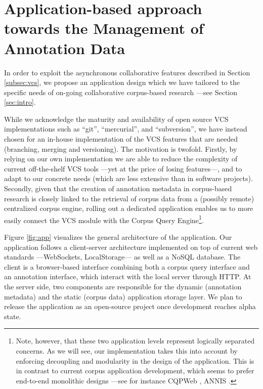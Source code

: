 \documentclass{sig-alternate}
\begin{document}

\section{Application-based approach towards the Management of Annotation Data}\label{sec:case}

In order to exploit the asynchronous collaborative features described in Section
\ref{subsec:vcs}, we propose an application design which we have tailored to the specific needs
of on-going collaborative corpus-based research ---see Section \ref{sec:intro}.

While we acknowledge the maturity and availability of open source VCS implementations such as
``git'', ``mercurial'', and ``subversion'', we have instead chosen for an in-house implementation
of the VCS features that are needed (branching, merging and versioning). The motivation is twofold.
Firstly, by relying on our own implementation we are able to reduce the complexity of
current off-the-shelf VCS tools ---yet at the price of losing features---,
and to adapt to our concrete needs (which are less extensive than in software projects).
Secondly, given that the creation of annotation metadata in corpus-based research
is closely linked to the retrieval of corpus data from a (possibly remote) centralized corpus engine,
rolling out a dedicated application enables us to more easily connect the VCS module with the Corpus
Query Engine\footnote{
  Note, however, that these two application levels represent logically separated concerns.
  As we will see, our implementation takes this into account by enforcing decoupling and modularity
  in the design of the application. This is in contrast to current corpus application development,
  which seems to prefer end-to-end monolithic designs ---see for instance
  CQPWeb \cite{Hardie2012}, ANNIS \cite{Zeldes2009}.
}.

Figure \ref{fig:app} visualizes the general architecture of the application.
Our application follows a client-server architecture implemented on top of current web
standards ---WebSockets, LocalStorage--- as well as a NoSQL database.
The client is a browser-based interface combining both a corpus query interface and an annotation
interface, which interact with the local server through HTTP.
At the server side, two components are responsible for the dynamic (annotation
metadata) and the static (corpus data) application storage layer. We plan to release the
application as an open-source project once development reaches alpha state.
\end{document}
